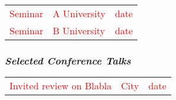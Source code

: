 \documentclass{ercgrant}
\begin{document}
\begin{longtable}{p{7.5cm}p{6cm}l}
	\textcolor{red}{Seminar} & \textcolor{red}{A University} & \textcolor{red}{date} \\
	\textcolor{red}{Seminar} & \textcolor{red}{B University} & \textcolor{red}{date} \\
\end{longtable}

\subsubsection*{\textit{Selected Conference Talks}}

\begin{longtable}{p{7.5cm}p{6cm}l}
	\textcolor{red}{Invited review on Blabla} & \textcolor{red}{City} & \textcolor{red}{date} \\
\end{longtable}
\end{document}

